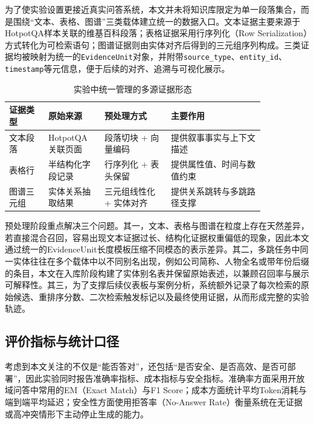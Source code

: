 为了使实验设置更接近真实问答系统，本文并未将知识库限定为单一段落集合，而是围绕“文本、表格、图谱”三类载体建立统一的数据入口。文本证据主要来源于HotpotQA样本关联的维基百科段落；表格证据采用行序列化（Row Serialization）方式转化为可检索语句；图谱证据则由实体对齐后得到的三元组序列构成。三类证据均被映射为统一的\texttt{EvidenceUnit}对象，并附带\texttt{source\_type}、\texttt{entity\_id}、\texttt{timestamp}等元信息，便于后续的对齐、追溯与可视化展示。

\begin{table}[!htbp]
\centering
\caption{实验中统一管理的多源证据形态}
\label{tab:data_sources}
\small
\begin{tabular}{|p{0.13\linewidth}|p{0.18\linewidth}|p{0.22\linewidth}|p{0.31\linewidth}|}
\hline
\textbf{证据类型} & \textbf{原始来源} & \textbf{预处理方式} & \textbf{主要作用} \\
\hline
文本段落 & HotpotQA关联页面 & 段落切块 + 向量编码 & 提供叙事事实与上下文描述 \\
\hline
表格行 & 半结构化字段记录 & 行序列化 + 表头保留 & 提供属性值、时间与数值约束 \\
\hline
图谱三元组 & 实体关系抽取结果 & 三元组线性化 + 实体对齐 & 提供关系跳转与多跳路径支撑 \\
\hline
\end{tabular}
\end{table}

预处理阶段重点解决三个问题。其一，文本、表格与图谱在粒度上存在天然差异，若直接混合召回，容易出现文本证据过长、结构化证据权重偏低的现象，因此本文通过统一的EvidenceUnit长度模板压缩不同模态的表示差异。其二，多跳任务中同一实体往往在多个载体中以不同别名出现，例如公司简称、人物全名或带年份后缀的条目，本文在入库阶段构建了实体别名表并保留原始表述，以兼顾召回率与展示可解释性。其三，为了支撑后续仪表板与案例分析，系统额外记录了每次检索的原始候选、重排序分数、二次检索触发标记以及最终使用证据，从而形成完整的实验轨迹。

\subsection{评价指标与统计口径}

考虑到本文关注的不仅是“能否答对”，还包括“是否安全、是否高效、是否可部署”，因此实验同时报告准确率指标、成本指标与安全指标。准确率方面采用开放域问答中常用的EM（Exact Match）与F1 Score；成本方面统计平均Token消耗与端到端平均延迟；安全性方面使用拒答率（No-Answer Rate）衡量系统在无证据或高冲突情形下主动停止生成的能力。

